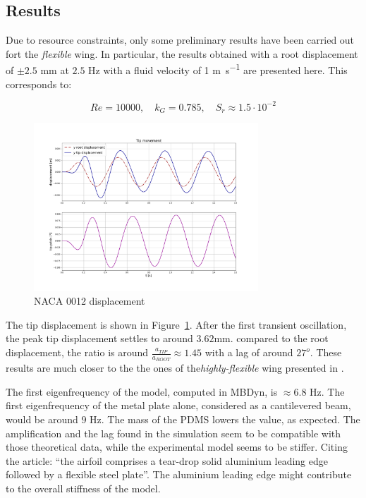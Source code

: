 \subsection{Results}

Due to resource constraints, only some preliminary results have been carried out fort the \textit{flexible} wing. In particular, the results obtained with a root displacement of $\pm2.5$ \si{mm} at $2.5$ \si{Hz} with a fluid velocity of 1 \si{m.s^{-1}} are presented here. This corresponds to:

\begin{equation}
    Re=10000,\quad k_G = 0.785, \quad S_r \approx 1.5\cdot 10^{-2}
\end{equation}

\begin{figure}[ht!]
	\centering
	\includegraphics[width=0.75\textwidth]{images/heathcote/naca0012_disp.png}
	\caption{NACA 0012 displacement}
	\label{fig:hc-tip-disp}
\end{figure}

The tip displacement is shown in Figure~\ref{fig:hc-tip-disp}. After the first transient oscillation, the peak tip displacement settles to around $3.62$\si{mm}. compared to the root displacement, the ratio is around $\frac{a_{TIP}}{a_{ROOT}} \approx 1.45$ with a lag of around $27^o$. These results are much closer to the the ones of the\textit{highly-flexible} wing presented in \cite{heathcote2008effect}.

The first eigenfrequency of the model, computed in MBDyn, is $\approx6.8$ \si{Hz}. The first eigenfrequency of the metal plate alone, considered as a cantilevered beam, would be around $9$ \si{Hz}. The mass of the PDMS lowers the value, as expected. The amplification and the lag found in the simulation seem to be compatible with those theoretical data, while the experimental model seems to be stiffer. Citing the article: ``the airfoil comprises a tear-drop solid aluminium leading edge followed by a flexible steel plate''. The aluminium leading edge might contribute to the overall stiffness of the model.  


